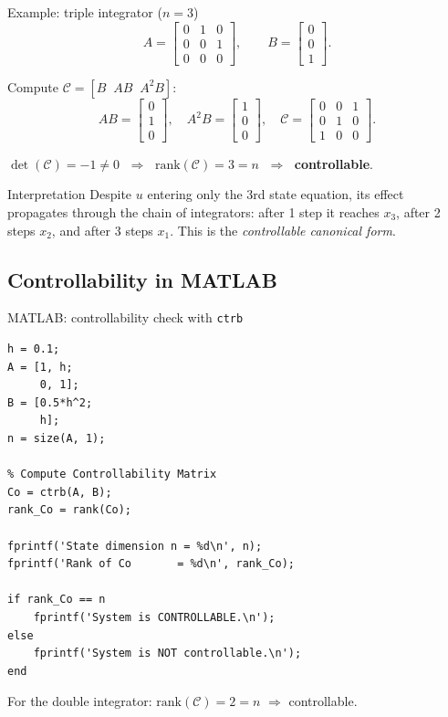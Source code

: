 \documentclass[aspectratio=169,10pt]{beamer}
\newcommand{\Ccal}{\mathcal{C}}
\begin{document}
\begin{frame}{Example: triple integrator ($n=3$)}
\[
A = \begin{bmatrix} 0 & 1 & 0 \\ 0 & 0 & 1 \\ 0 & 0 & 0 \end{bmatrix},
\qquad
B = \begin{bmatrix} 0 \\ 0 \\ 1 \end{bmatrix}.
\]

Compute $\Ccal = [B \;\; AB \;\; A^2B]$:
\[
AB = \begin{bmatrix}0\\1\\0\end{bmatrix},
\quad
A^2B = \begin{bmatrix}1\\0\\0\end{bmatrix},
\quad
\Ccal = \begin{bmatrix}
0 & 0 & 1\\
0 & 1 & 0\\
1 & 0 & 0
\end{bmatrix}.
\]

$\det(\Ccal) = -1 \neq 0$
$\;\Rightarrow\;$ $\mathrm{rank}(\Ccal)=3=n$
$\;\Rightarrow\;$ \textbf{controllable}.

\begin{notebox}{Interpretation}
Despite $u$ entering only the 3rd state equation, its effect propagates
through the chain of integrators: after 1 step it reaches $x_3$, after 2
steps $x_2$, and after 3 steps $x_1$.  This is the \emph{controllable
canonical form}.
\end{notebox}
\end{frame}

\subsection{Controllability in MATLAB}

\begin{frame}[fragile]{MATLAB: controllability check with \texttt{ctrb}}
\begin{lstlisting}[caption={Checking controllability of a double integrator.}]
% Discrete-time double integrator
h = 0.1;
A = [1, h;
     0, 1];
B = [0.5*h^2;
     h];
n = size(A, 1);

% Compute Controllability Matrix
Co = ctrb(A, B);
rank_Co = rank(Co);

fprintf('State dimension n = %d\n', n);
fprintf('Rank of Co       = %d\n', rank_Co);

if rank_Co == n
    fprintf('System is CONTROLLABLE.\n');
else
    fprintf('System is NOT controllable.\n');
end
\end{lstlisting}

For the double integrator: $\mathrm{rank}(\Ccal)=2=n$ $\Rightarrow$ controllable.
\end{frame}
\end{document}
